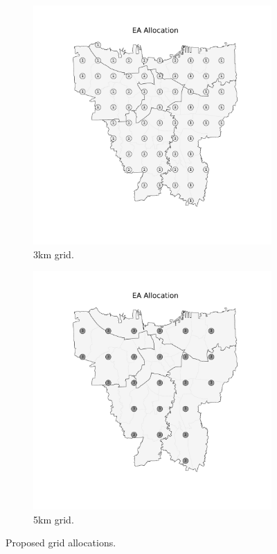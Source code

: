 \documentclass[preprint,12pt]{elsarticle}
\begin{document}
\begin{figure} \begin{center} \begin{subfigure}{0.48\textwidth}
\includegraphics[width=\textwidth]{img/map_grid3km_proposed} \caption{3km grid.}
\end{subfigure} \hfill \begin{subfigure}{0.48\textwidth}
    \includegraphics[width=\textwidth]{img/map_grid5km_proposed} \caption{5km
grid.} \end{subfigure} \caption{Proposed grid allocations.}
\label{fig:grid_allocations} \end{center} \end{figure}
\end{document}
